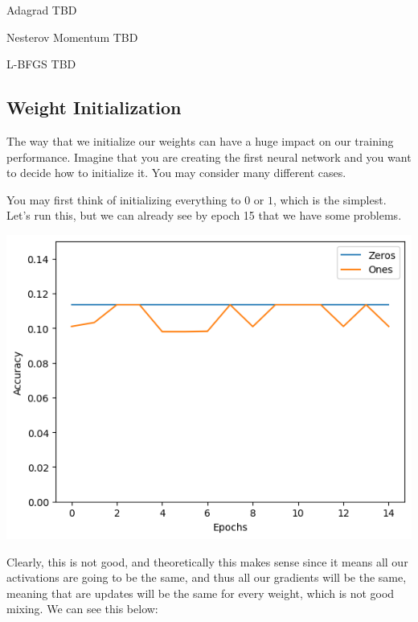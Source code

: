     \begin{definition}{Adagrad}
      TBD
    \end{definition}

    \begin{definition}{Nesterov Momentum}
      TBD
    \end{definition}

    \begin{definition}{L-BFGS}
      TBD
    \end{definition}

  \subsection{Weight Initialization}

    The way that we initialize our weights can have a huge impact on our training performance. Imagine that you are creating the first neural network and you want to decide how to initialize it. You may consider many different cases. 

    \begin{example}
      You may first think of initializing everything to $0$ or $1$, which is the simplest. Let's run this, but we can already see by epoch 15 that we have some problems. 
      \begin{center}
        \includegraphics[scale=0.5]{img/01_MLP/first_initialize.png}
      \end{center}
      Clearly, this is not good, and theoretically this makes sense since it means all our activations are going to be the same, and thus all our gradients will be the same, meaning that are updates will be the same for every weight, which is not good mixing. We can see this below: 
    \end{example}

